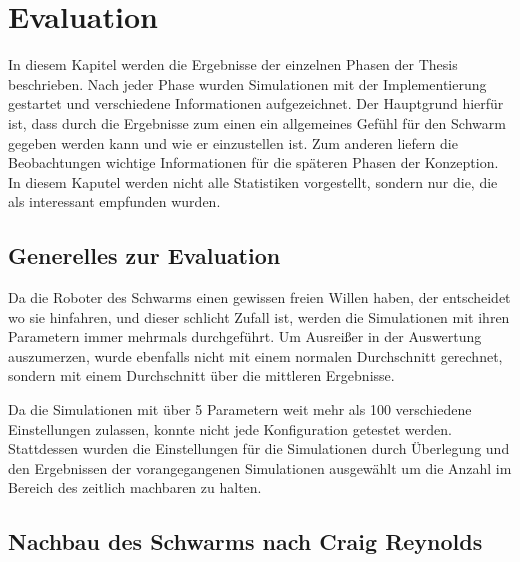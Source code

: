 \chapter{Evaluation}\label{ch:Evaluation}

In diesem Kapitel werden die Ergebnisse der einzelnen Phasen der Thesis beschrieben. Nach jeder Phase wurden Simulationen mit der Implementierung gestartet und verschiedene Informationen aufgezeichnet. Der Hauptgrund hierfür ist, dass durch die Ergebnisse zum einen ein allgemeines Gefühl für den Schwarm gegeben werden kann und wie er einzustellen ist. Zum anderen liefern die Beobachtungen wichtige Informationen für die späteren Phasen der Konzeption.
In diesem Kaputel werden nicht alle Statistiken vorgestellt, sondern nur die, die als interessant empfunden wurden.

\section{Generelles zur Evaluation}

Da die Roboter des Schwarms einen gewissen freien Willen haben, der entscheidet wo sie hinfahren, und dieser schlicht Zufall ist, werden die Simulationen mit ihren Parametern immer mehrmals durchgeführt. Um Ausreißer in der Auswertung auszumerzen, wurde ebenfalls nicht mit einem normalen Durchschnitt gerechnet, sondern mit einem Durchschnitt über die mittleren Ergebnisse.

Da die Simulationen mit über 5 Parametern weit mehr als 100 verschiedene Einstellungen zulassen, konnte nicht jede Konfiguration getestet werden. Stattdessen wurden die Einstellungen für die Simulationen durch Überlegung und den Ergebnissen der vorangegangenen Simulationen ausgewählt um die Anzahl im Bereich des zeitlich machbaren zu halten.

\section{Nachbau des Schwarms nach Craig Reynolds}

